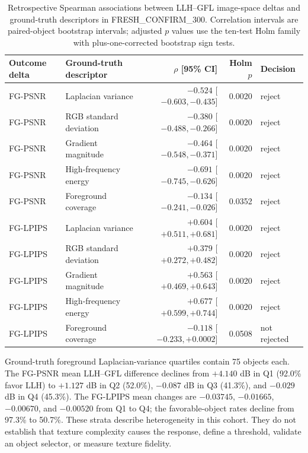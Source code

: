\documentclass[11pt]{article}
\begin{document}
\begin{table}[ht]
\centering\scriptsize
\caption{Retrospective Spearman associations between LLH--GFL image-space deltas and ground-truth descriptors in FRESH\_CONFIRM\_300. Correlation intervals are paired-object bootstrap intervals; adjusted $p$ values use the ten-test Holm family with plus-one-corrected bootstrap sign tests.}
\label{tab:texture-complexity}
\begin{tabular}{llrrl}
\toprule Outcome delta & Ground-truth descriptor & $\rho$ [95\% CI] & Holm $p$ & Decision \\
\midrule
FG-PSNR & Laplacian variance & $-0.524$ [$-0.603,-0.435$] & 0.0020 & reject \\
FG-PSNR & RGB standard deviation & $-0.380$ [$-0.488,-0.266$] & 0.0020 & reject \\
FG-PSNR & Gradient magnitude & $-0.464$ [$-0.548,-0.371$] & 0.0020 & reject \\
FG-PSNR & High-frequency energy & $-0.691$ [$-0.745,-0.626$] & 0.0020 & reject \\
FG-PSNR & Foreground coverage & $-0.134$ [$-0.241,-0.026$] & 0.0352 & reject \\
FG-LPIPS & Laplacian variance & $+0.604$ [$+0.511,+0.681$] & 0.0020 & reject \\
FG-LPIPS & RGB standard deviation & $+0.379$ [$+0.272,+0.482$] & 0.0020 & reject \\
FG-LPIPS & Gradient magnitude & $+0.563$ [$+0.469,+0.643$] & 0.0020 & reject \\
FG-LPIPS & High-frequency energy & $+0.677$ [$+0.599,+0.744$] & 0.0020 & reject \\
FG-LPIPS & Foreground coverage & $-0.118$ [$-0.233,+0.0002$] & 0.0508 & not rejected \\
\bottomrule
\end{tabular}
\end{table}

Ground-truth foreground Laplacian-variance quartiles contain 75 objects each. The FG-PSNR mean LLH--GFL difference declines from $+4.140$ dB in Q1 (92.0\% favor LLH) to $+1.127$ dB in Q2 (52.0\%), $-0.087$ dB in Q3 (41.3\%), and $-0.029$ dB in Q4 (45.3\%). The FG-LPIPS mean changes are $-0.03745$, $-0.01665$, $-0.00670$, and $-0.00520$ from Q1 to Q4; the favorable-object rates decline from 97.3\% to 50.7\%. These strata describe heterogeneity in this cohort. They do not establish that texture complexity causes the response, define a threshold, validate an object selector, or measure texture fidelity.
\end{document}
